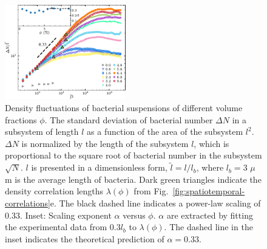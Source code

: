 \documentclass[twocolumn,aps,prx,amsmath,amssymb,longbibliography]{revtex4-2}
\begin{document}
\begin{figure}[t]
	\begin{center}
		\includegraphics[width=0.47\textwidth]{figures/fig-3.pdf}
		\caption[Concentration dependence of GNF.]
		{
			Density fluctuations of bacterial suspensions of different volume fractions $\phi$. The standard deviation of bacterial number $\Delta N$ in a subsystem of length $l$ as a function of the area of the subsystem $l^2$. $\Delta N$ is normalized by the length of the subsystem $l$, which is proportional to the square root of bacterial number in the subsystem $\sqrt N$. $l$ is presented in a dimensionless form, $\tilde{l} = l/l_b$, where $l_b = 3$ $\mu$m is the average length of bacteria. Dark green triangles indicate the density correlation lengths $\lambda(\phi)$ from Fig.~\ref{fig:spatiotemporal-correlations}e. The black dashed line indicates a power-law scaling of 0.33.
			Inset: Scaling exponent $\alpha$ versus $\phi$. $\alpha$ are extracted by fitting the experimental data from 0.3$l_b$ to $\lambda(\phi)$. The dashed line in the inset indicates the theoretical prediction of $\alpha=0.33$.
		}
		\label{fig:GNF}
	\end{center}
\end{figure}
\end{document}
